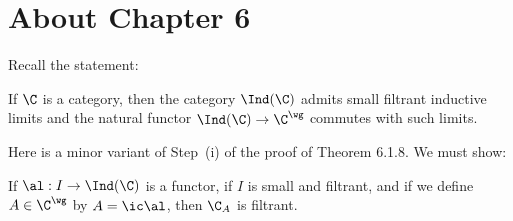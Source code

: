 \documentclass[12pt]{article}
\theoremstyle{remark}
\theoremstyle{definition}
\begin{document}

\section{About Chapter 6}


Recall the statement:

\begin{thm}[Theorem 6.1.8 p.~132]
If $\C$ is a category, then the category $\Ind(\C)$ admits small filtrant inductive limits and the natural functor $\Ind(\C)\to\C^\wg$ commutes with such limits.
\end{thm} 



Here is a minor variant of Step~(i) of the proof of Theorem 6.1.8. We must show:  

\begin{lem} 
If $\al:I\to\Ind(\C)$ is a functor, if $I$ is small and filtrant, and if we define $A\in\C^\wg$ by $A=\ic\al$, then $\C_A$ is filtrant. 
\end{lem} 
\end{document}
